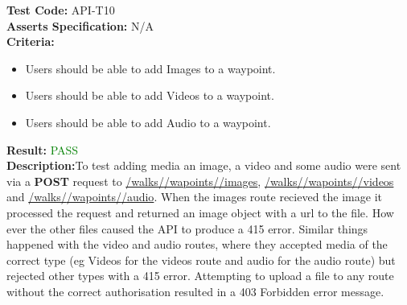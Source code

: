 \documentclass[11pt,a4paper]{report}
\begin{document}
\label{test:API-T10}
\noindent\textbf{Test Code:} API-T10\\
\textbf{Asserts Specification:} N/A \\ 
\textbf{Criteria:} \begin{itemize}
                     \item Users should be able to add Images to a waypoint.
                     \item Users should be able to add Videos to a waypoint.
                     \item Users should be able to add Audio to a waypoint.
                   \end{itemize}  
\textbf{Result:} \textcolor{green}{PASS}\\ 
\textbf{Description:}To test adding media an image, a video and some audio were sent via a \textbf{POST} request to \url{/walks/}\url{/wapoints/}\url{/images}, \url{/walks/}\url{/wapoints/}\url{/videos} and \url{/walks/}\url{/wapoints/}\url{/audio}. When the images route recieved the image it processed the request and returned an image object with a url to the file. How ever the other files caused the API to produce a 415 error. Similar things happened with the video and audio routes, where they accepted media of the correct type (eg Videos for the videos route and audio for the audio route) but rejected other types with a 415 error. Attempting to upload a file to any route without the correct authorisation resulted in a 403 Forbidden error message. 
\end{document}
